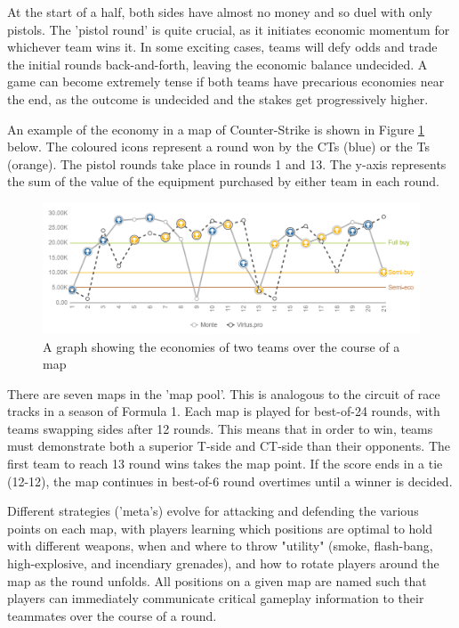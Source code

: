 At the start of a half, both sides have almost no money and so duel with only pistols. The 'pistol round' is quite crucial, as it initiates economic momentum for whichever team wins it. In some exciting cases, teams will defy odds and trade the initial rounds back-and-forth, leaving the economic balance undecided. A game can become extremely tense if both teams have precarious economies near the end, as the outcome is undecided and the stakes get progressively higher. 

An example of the economy in a map of Counter-Strike is shown in Figure \ref{fig:economy} below. The coloured icons represent a round won by the CTs (blue) or the Ts (orange). The pistol rounds take place in rounds 1 and 13. The y-axis represents the sum of the value of the equipment purchased by either team in each round.

\begin{figure}[h]
	\centering
	\includegraphics[width=\textwidth]{Figures/economy.png}
	\caption{A graph showing the economies of two teams over the course of a map}
	\label{fig:economy}
\end{figure}

There are seven maps in the 'map pool'. This is analogous to the circuit of race tracks in a season of Formula 1. Each map is played for best-of-24 rounds, with teams swapping sides after 12 rounds. This means that in order to win, teams must demonstrate both a superior T-side and CT-side than their opponents. The first team to reach 13 round wins takes the map point. If the score ends in a tie (12-12), the map continues in best-of-6 round overtimes until a winner is decided.

Different strategies ('meta's) evolve for attacking and defending the various points on each map, with players learning which positions are optimal to hold with different weapons, when and where to throw "utility" (smoke, flash-bang, high-explosive, and incendiary grenades), and how to rotate players around the map as the round unfolds. All positions on a given map are named such that players can immediately communicate critical gameplay information to their teammates over the course of a round.

